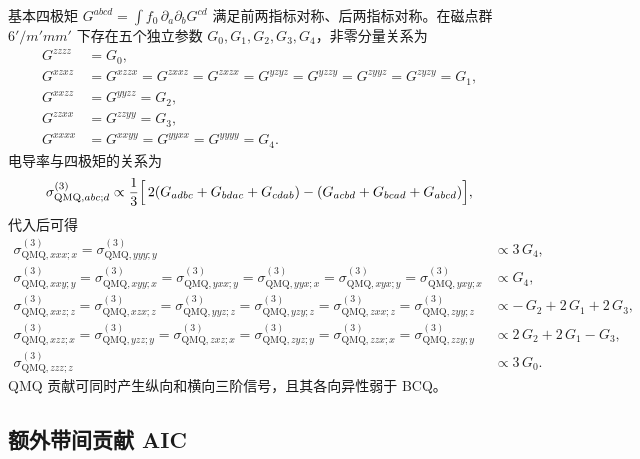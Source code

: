基本四极矩 \(G^{abcd} = \int f_0\,\partial_{a}\partial_{b}G^{cd}\) 满足前两指标对称、后两指标对称。在磁点群 \(6'/m'mm'\) 下存在五个独立参数 \(G_{0},G_{1},G_{2},G_{3},G_{4}\)，非零分量关系为
\begin{equation}
\begin{aligned}
  G^{zzzz} &= G_{0},\\
  G^{xzxz} &= G^{xzzx} = G^{zxxz} = G^{zxzx}
            = G^{yzyz} = G^{yzzy} = G^{zyyz} = G^{zyzy} = G_{1},\\
  G^{xxzz} &= G^{yyzz} = G_{2},\\
  G^{zzxx} &= G^{zzyy} = G_{3},\\
  G^{xxxx} &= G^{xxyy} = G^{yyxx} = G^{yyyy} = G_{4}.
\end{aligned}
\end{equation}
电导率与四极矩的关系为
\begin{equation}
  \sigma^{(3)}_{\mathrm{QMQ}, abc;d} \propto
    \frac{1}{3}\Bigl[\,2(G_{adbc}+G_{bdac}+G_{cdab})
                 - (G_{acbd}+G_{bcad}+G_{abcd})\Bigr],
\end{equation}
代入后可得
\begin{equation}
\begin{aligned}
  \sigma^{(3)}_{\mathrm{QMQ}, xxx;x}
  = \sigma^{(3)}_{\mathrm{QMQ}, yyy;y} &\propto 3\,G_{4},\\[2pt]
  \sigma^{(3)}_{\mathrm{QMQ}, xxy;y}
  = \sigma^{(3)}_{\mathrm{QMQ}, xyy;x}
  = \sigma^{(3)}_{\mathrm{QMQ}, yxx;y}
  = \sigma^{(3)}_{\mathrm{QMQ}, yyx;x}
  = \sigma^{(3)}_{\mathrm{QMQ}, xyx;y}
  = \sigma^{(3)}_{\mathrm{QMQ}, yxy;x} &\propto G_{4},\\[2pt]
  \sigma^{(3)}_{\mathrm{QMQ}, xxz;z}
  = \sigma^{(3)}_{\mathrm{QMQ}, xzx;z}
  = \sigma^{(3)}_{\mathrm{QMQ}, yyz;z}
  = \sigma^{(3)}_{\mathrm{QMQ}, yzy;z}
  = \sigma^{(3)}_{\mathrm{QMQ}, zxx;z}
  = \sigma^{(3)}_{\mathrm{QMQ}, zyy;z}
  &\propto -\,G_{2} + 2\,G_{1} + 2\,G_{3},\\[2pt]
  \sigma^{(3)}_{\mathrm{QMQ}, xzz;x}
  = \sigma^{(3)}_{\mathrm{QMQ}, yzz;y}
  = \sigma^{(3)}_{\mathrm{QMQ}, zxz;x}
  = \sigma^{(3)}_{\mathrm{QMQ}, zyz;y}
  = \sigma^{(3)}_{\mathrm{QMQ}, zzx;x}
  = \sigma^{(3)}_{\mathrm{QMQ}, zzy;y}
  &\propto 2\,G_{2} + 2\,G_{1} - G_{3},\\[2pt]
  \sigma^{(3)}_{\mathrm{QMQ}, zzz;z} &\propto 3\,G_{0}.
\end{aligned}
\end{equation}
QMQ 贡献可同时产生纵向和横向三阶信号，且其各向异性弱于 BCQ。

\subsection{额外带间贡献 AIC}

